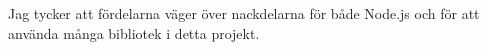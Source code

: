 Jag tycker att fördelarna väger över nackdelarna för både Node.js och för att använda många bibliotek i detta projekt.


	
	
	
